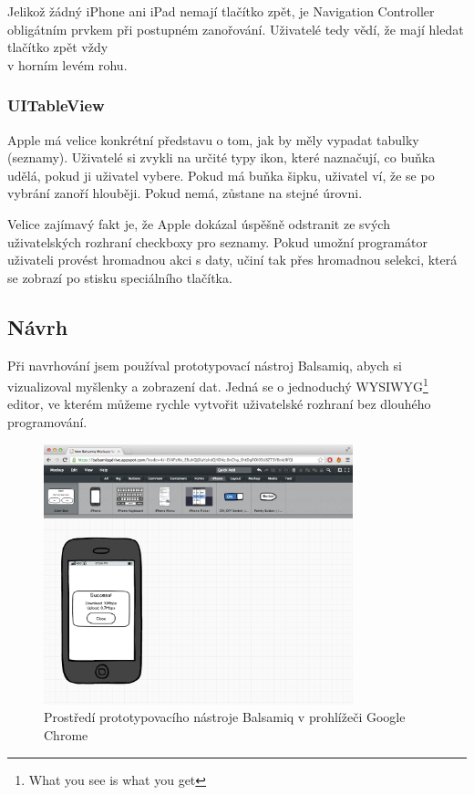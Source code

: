 Jelikož žádný iPhone ani iPad nemají tlačítko zpět, je Navigation Controller obligátním prvkem při postupném zanořování. Uživatelé tedy vědí, že mají hledat tlačítko zpět vždy \\v horním levém rohu.

\subsubsection*{UITableView}
Apple má velice konkrétní představu o tom, jak by měly vypadat tabulky (seznamy). Uživatelé si zvykli na určité typy ikon, které naznačují, co buňka udělá, pokud ji uživatel vybere. Pokud má buňka šipku, uživatel ví, že se po vybrání zanoří hlouběji. Pokud nemá, zůstane na stejné úrovni. 

Velice zajímavý fakt je, že Apple dokázal úspěšně odstranit ze svých uživatelských rozhraní checkboxy pro seznamy. Pokud umožní programátor uživateli provést hromadnou akci s daty, učiní tak přes hromadnou selekci, která se zobrazí po stisku speciálního tlačítka.

\newpage

\subsection{Návrh}
Při navrhování jsem používal prototypovací nástroj Balsamiq, abych si vizualizoval myšlenky a zobrazení dat. Jedná se o jednoduchý WYSIWYG\footnote{What you see is what you get} editor, ve kterém můžeme rychle vytvořit uživatelské rozhraní bez dlouhého programování.

\begin{figure}[h]
	\centering
    \includegraphics[width=0.8\textwidth]{figures/03_implementation/balsamiq.jpg}
    \caption{Prostředí prototypovacího nástroje Balsamiq v prohlížeči Google Chrome}
    \label{bals}
\end{figure}

